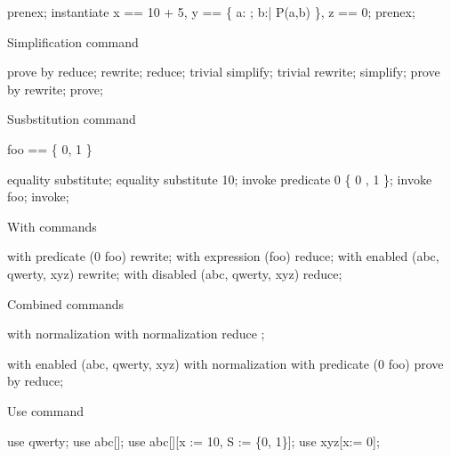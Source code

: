\begin{zproof}[qntCmd]
prenex;
instantiate x == 10 + 5, y == \{ a: \nat; b:\nat | P(a,b) \},
    z == 0;
prenex;
\end{zproof}

Simplification command

\begin{zproof}[simpCmd]
prove by reduce;
rewrite;
reduce;
trivial simplify;
trivial rewrite;
simplify;
prove by rewrite;
prove;
\end{zproof}

Susbstitution command

\begin{zed}
   foo == \{ 0, 1 \}
\end{zed}

\begin{zproof}[substCmd]
equality substitute;
equality substitute 10;
invoke predicate 0 \in \{ 0 , 1 \};
invoke foo;
invoke;
\end{zproof}

With commands

\begin{zproof}[withCmds]
with predicate (0 \in foo) rewrite;
with expression (foo) reduce;
with enabled (abc, qwerty, xyz) rewrite;
with disabled (abc, qwerty, xyz) reduce;
\end{zproof}

Combined commands

\begin{zproof}[combinedCmd1]
with normalization
      with
          normalization
              reduce
      ;           %

with enabled (abc, qwerty, xyz)
  with normalization
    with predicate (0 \in foo)
      prove by reduce;
\end{zproof}

Use command

\begin{zproof}[useCmd]
use qwerty;
use abc[\nat];
use abc[\nat][x := 10, S := \{0, 1\}];
use xyz[x:= 0];
\end{zproof}
